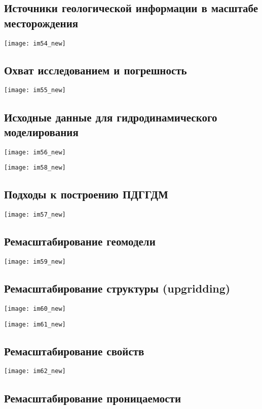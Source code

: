 \documentclass[main.tex]{subfiles}
\begin{document}
\subsection{Источники геологической информации в масштабе месторождения}

\texttt{[image: im54\_new]}

\subsection{Охват исследованием и погрешность}

\texttt{[image: im55\_new]}

\subsection{Исходные данные для гидродинамического моделирования}

\texttt{[image: im56\_new]}

\texttt{[image: im58\_new]}

\subsection{Подходы к построению ПДГГДМ}

\texttt{[image: im57\_new]}

\subsection{Ремасштабирование геомодели}

\texttt{[image: im59\_new]}

\subsection{Ремасштабирование структуры (upgridding)}

\texttt{[image: im60\_new]}

\texttt{[image: im61\_new]}

\subsection{Ремасштабирование свойств}

\texttt{[image: im62\_new]}

\subsection{Ремасштабирование проницаемости}
\end{document}
